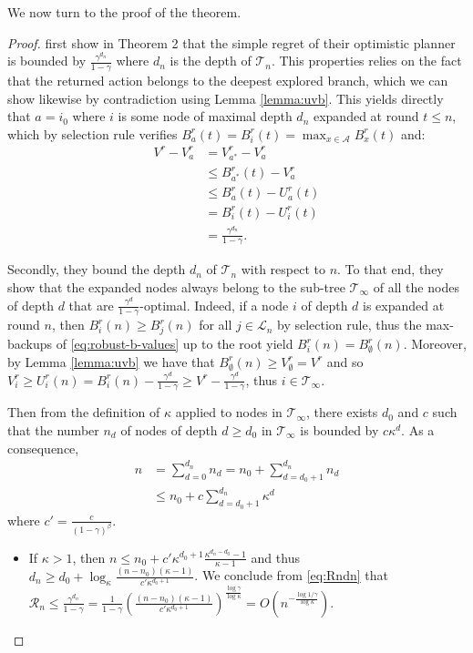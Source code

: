 \documentclass{article}
\begin{document}
We now turn to the proof of the theorem.

\begin{proof}
	\citet{Hren2008} first show in Theorem 2 that the simple regret of their optimistic planner is bounded by $\frac{\gamma^{d_n}}{1 - \gamma}$ where $d_n$ is the depth of $\mathcal{T}_n$. This properties relies on the fact that the returned action belongs to the deepest explored branch, which we can show likewise by contradiction using Lemma \ref{lemma:uvb}. This yields directly that $a = i_0$ where $i$ is some node of maximal depth $d_n$ expanded at round $t\leq n$, which by selection rule verifies $B_a^r(t) = B_i^r(t) = \max_{x\in\mathcal{A}} B_x^r(t)$ and:
	\begin{align}
	\label{eq:Rndn}
	V^r - V_a^r &= V_{a^*}^r - V_a^r \\
	&\leq B_{a^*}^r(t) - V_a^r \\
	&\leq B_{a}^r(t) - U_a^r(t) \\
	&= B_{i}^r(t) - U_i^r(t) \\
	&= \frac{\gamma^{d_n}}{1-\gamma}.
	\end{align}
	
	Secondly, they bound the depth $d_n$ of $\mathcal{T}_n$ with respect to $n$. To that end, they show that the expanded nodes always belong to the sub-tree $\mathcal{T}_\infty$ of all the nodes of depth $d$ that are $\frac{\gamma^d}{1-\gamma}$-optimal. Indeed, if a node $i$ of depth $d$ is expanded at round $n$, then $B_i^r(n) \geq B_j^r(n)$ for all $j\in \mathcal{L}_n$ by selection rule, thus the max-backups of \eqref{eq:robust-b-values} up to the root yield $B^r_i(n) = B_\emptyset^r(n)$. Moreover, by Lemma \ref{lemma:uvb} we have that $B_\emptyset^r(n) \geq V_\emptyset^r = V^r$ and so $V_i^r \geq U_i^r(n) = B_i^r(n) - \frac{\gamma^d}{1-\gamma} \geq V^r - \frac{\gamma^d}{1-\gamma}$, thus $i \in \mathcal{T}_\infty$.
	
	Then from the definition of $\kappa$ applied to nodes in $\mathcal{T}_\infty$, there exists $d_0$ and $c$ such that the number $n_d$ of nodes of depth $d \geq d_0$ in $\mathcal{T}_\infty$ is bounded by $c\kappa^d$. As a consequence, 
	\begin{eqnarray*}
		n &= \sum_{d=0}^{d_n} n_d = n_0 + \sum_{d=d_0+1}^{d_n} n_d \\
		&\leq n_0 + c\sum_{d={d_0+1}}^{d_n} \kappa^d
	\end{eqnarray*}
	where $c'=\frac{c}{(1-\gamma)^\beta}$.
	
	\begin{itemize}
		\item If $\kappa > 1$, then $n \leq n_0 + c'\kappa^{d_0+1}\frac{\kappa^{d_n-d_0}-1}{\kappa-1}$ and thus $d_n \geq d_0 + \log_\kappa \frac{(n-n_0)(\kappa - 1)}{c'\kappa^{d_0+1}}$.
		We conclude from \eqref{eq:Rndn} that $\mathcal{R}_n \leq \frac{\gamma^{d_n}}{1-\gamma} = \frac{1}{1-\gamma} \left( \frac{(n-n_0)(\kappa - 1)}{c'\kappa^{d_0+1}} \right)^\frac{\log \gamma}{\log \kappa} = O\left(n^{-\frac{\log 1/\gamma}{\log \kappa}}\right)$.
		

\end{itemize}
\end{proof}
\end{document}
